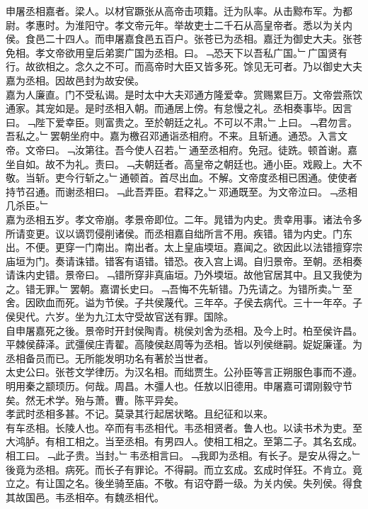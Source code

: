 \documentclass{zhvt-classic}
\begin{document}
\hspace*{2em}申屠丞相嘉者。梁人。以材官蹶张从高帝击项籍。迁为队率。从击黥布军。为都尉。孝惠时。为淮阳守。孝文帝元年。举故吏士二千石从高皇帝者。悉以为关内侯。食邑二十四人。而申屠嘉食邑五百户。张苍已为丞相。嘉迁为御史大夫。张苍免相。孝文帝欲用皇后弟窦广国为丞相。曰。﹁恐天下以吾私广国。﹂广国贤有行。故欲相之。念久之不可。而高帝时大臣又皆多死。馀见无可者。乃以御史大夫嘉为丞相。因故邑封为故安侯。\\
\hspace*{2em}嘉为人廉直。门不受私谒。是时太中大夫邓通方隆爱幸。赏赐累巨万。文帝尝燕饮通家。其宠如是。是时丞相入朝。而通居上傍。有怠慢之礼。丞相奏事毕。因言曰。﹁陛下爱幸臣。则富贵之。至於朝廷之礼。不可以不肃。﹂上曰。﹁君勿言。吾私之。﹂罢朝坐府中。嘉为檄召邓通诣丞相府。不来。且斩通。通恐。入言文帝。文帝曰。﹁汝第往。吾今使人召若。﹂通至丞相府。免冠。徒跣。顿首谢。嘉坐自如。故不为礼。责曰。﹁夫朝廷者。高皇帝之朝廷也。通小臣。戏殿上。大不敬。当斩。吏今行斩之。﹂通顿首。首尽出血。不解。文帝度丞相已困通。使使者持节召通。而谢丞相曰。﹁此吾弄臣。君释之。﹂邓通既至。为文帝泣曰。﹁丞相几杀臣。﹂\\
\hspace*{2em}嘉为丞相五岁。孝文帝崩。孝景帝即位。二年。晁错为内史。贵幸用事。诸法令多所请变更。议以谪罚侵削诸侯。而丞相嘉自绌所言不用。疾错。错为内史。门东出。不便。更穿一门南出。南出者。太上皇庙堧垣。嘉闻之。欲因此以法错擅穿宗庙垣为门。奏请诛错。错客有语错。错恐。夜入宫上谒。自归景帝。至朝。丞相奏请诛内史错。景帝曰。﹁错所穿非真庙垣。乃外堧垣。故他官居其中。且又我使为之。错无罪。﹂罢朝。嘉谓长史曰。﹁吾悔不先斩错。乃先请之。为错所卖。﹂至舍。因欧血而死。谥为节侯。子共侯蔑代。三年卒。子侯去病代。三十一年卒。子侯臾代。六岁。坐为九江太守受故官送有罪。国除。\\
\hspace*{2em}自申屠嘉死之後。景帝时开封侯陶青。桃侯刘舍为丞相。及今上时。柏至侯许昌。平棘侯薛泽。武彊侯庄青翟。高陵侯赵周等为丞相。皆以列侯继嗣。娖娖廉谨。为丞相备员而已。无所能发明功名有著於当世者。\\
\hspace*{2em}太史公曰。张苍文学律历。为汉名相。而绌贾生。公孙臣等言正朔服色事而不遵。明用秦之颛顼历。何哉。周昌。木彊人也。任敖以旧德用。申屠嘉可谓刚毅守节矣。然无术学。殆与萧。曹。陈平异矣。\\
\hspace*{2em}孝武时丞相多甚。不记。莫录其行起居状略。且纪征和以来。\\
\hspace*{2em}有车丞相。长陵人也。卒而有韦丞相代。韦丞相贤者。鲁人也。以读书术为吏。至大鸿胪。有相工相之。当至丞相。有男四人。使相工相之。至第二子。其名玄成。相工曰。﹁此子贵。当封。﹂韦丞相言曰。﹁我即为丞相。有长子。是安从得之。﹂後竟为丞相。病死。而长子有罪论。不得嗣。而立玄成。玄成时佯狂。不肯立。竟立之。有让国之名。後坐骑至庙。不敬。有诏夺爵一级。为关内侯。失列侯。得食其故国邑。韦丞相卒。有魏丞相代。\\
\end{document}
